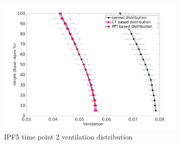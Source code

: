 \begin{figure}[htbp]  
\centering
\begin{subfigure}{.6\linewidth}%
  \includegraphics[width=\linewidth,trim={{.0\wd0} {.0\wd0} {.0\wd0} {.0\wd0}},clip]{Appendix/Image_AppexB/IPF501/IPF501_VentilationAgainstLungHeight.png} %
  \caption{IPF5 time point 2 ventilation distribution}
  \label{fig:IPF501VQDistribution-a} 
\end{subfigure} 
\begin{subfigure}{.6\linewidth}%

\end{subfigure}
\end{figure}
